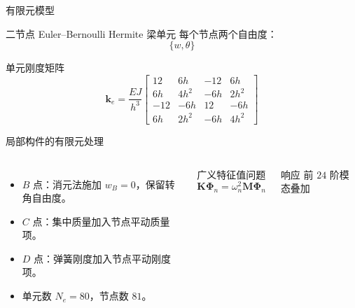 \documentclass[UTF8,aspectratio=169,10pt]{ctexbeamer}
\begin{document}
\begin{frame}{有限元模型}
  \begin{block}{二节点 Euler--Bernoulli Hermite 梁单元}
    每个节点两个自由度：
    \[
    \{w,\theta\}
    \]
  \end{block}
  \begin{block}{单元刚度矩阵}
    \[
    \mathbf k_e=
    \frac{EJ}{h^3}
    \begin{bmatrix}
    12&6h&-12&6h\\
    6h&4h^2&-6h&2h^2\\
    -12&-6h&12&-6h\\
    6h&2h^2&-6h&4h^2
    \end{bmatrix}
    \]
  \end{block}
\end{frame}

\begin{frame}{局部构件的有限元处理}
  \begin{columns}[T,onlytextwidth]
    \begin{itemize}
      \item $B$ 点：消元法施加 $w_B=0$，保留转角自由度。
      \item $C$ 点：集中质量加入节点平动质量项。
      \item $D$ 点：弹簧刚度加入节点平动刚度项。
      \item 单元数 $N_e=80$，节点数 $81$。
    \end{itemize}
    \begin{block}{广义特征值问题}
      \[
      \mathbf K\boldsymbol\Phi_n
      =
      \omega_n^2
      \mathbf M\boldsymbol\Phi_n
      \]
    \end{block}
    \begin{block}{响应}
      前 $24$ 阶模态叠加
    \end{block}
  \end{columns}
\end{frame}
\end{document}
